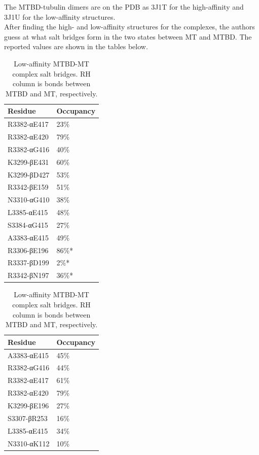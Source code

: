 \documentclass[10pt]{article} %
\begin{document}
The MTBD-tubulin dimers are on the PDB as 3J1T for the high-affinity and 3J1U for the low-affinity structures.\\

After finding the high- and low-affinity structures for the complexes, the authors guess at what salt bridges form in the two states between MT and MTBD. The reported values are shown in the tables below.\\

\begin{table}
  \parbox{.45\linewidth}{
    \centering
    \begin{tabular}{| l | l |}
      \hline
      Residue & Occupancy \\\hline
      R3382-αE417 & 23\% \\\hline
      R3382-αE420 & 79\% \\\hline
      R3382-αG416 & 40\% \\\hline
      K3299-βE431 & 60\% \\\hline
      K3299-βD427 & 53\% \\\hline
      R3342-βE159 & 51\% \\\hline
      N3310-αG410 & 38\% \\\hline
      L3385-αE415 & 48\% \\\hline
      S3384-αG415 & 27\% \\\hline
      A3383-αE415 & 49\% \\\hline
      R3306-βE196 & 86\%*\\\hline
      R3337-βD199 & 2\%* \\\hline
      R3342-βN197 & 36\%*\\\hline
    \end{tabular}
    \caption{High-affinity MTBD-MT complex salt bridges. RH column is bonds between MTBD and MT, respectively.}
  }
  \hfill
  \parbox{.45\linewidth}{
    \centering
    \begin{tabular}{| l | l |}
      \hline
      Residue & Occupancy \\\hline
      A3383-αE415  & 45\% \\ \hline
      R3382-αG416  & 44\% \\ \hline
      R3382-αE417  & 61\% \\ \hline
      R3382-αE420  & 79\% \\ \hline
      K3299-βE196  & 27\% \\ \hline
      S3307-βR253  & 16\% \\ \hline
      L3385-αE415  & 34\% \\ \hline
      N3310-αK112  & 10\% \\ \hline
    \end{tabular}
    \caption{Low-affinity MTBD-MT complex salt bridges. RH column is bonds between MTBD and MT, respectively.}
  }
\end{table}
\end{document}
